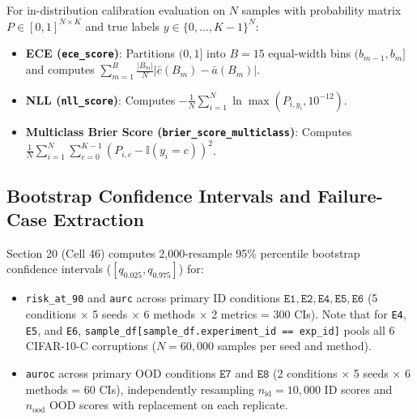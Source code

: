 \documentclass[11pt,a4paper]{article}
\begin{document}
For in-distribution calibration evaluation on $N$ samples with probability matrix $P \in [0, 1]^{N \times K}$ and true labels $y \in \{0, \dots, K-1\}^N$:
\begin{itemize}
  \item \textbf{ECE (\texttt{ece\_\allowbreak{}score})}: Partitions $(0, 1]$ into $B = 15$ equal-width bins $(b_{m-1}, b_m]$ and computes $\sum_{m=1}^B \frac{|B_m|}{N} \left|\bar{c}(B_m) - \bar{a}(B_m)\right|$.
  \item \textbf{NLL (\texttt{nll\_\allowbreak{}score})}: Computes $-\frac{1}{N} \sum_{i=1}^N \ln \max(P_{i, y_i}, 10^{-12})$.
  \item \textbf{Multiclass Brier Score (\texttt{brier\_\allowbreak{}score\_\allowbreak{}multiclass})}: Computes $\frac{1}{N} \sum_{i=1}^N \sum_{c=0}^{K-1} (P_{i,c} - \mathbb{I}(y_i = c))^2$.
\end{itemize}

\subsection{Bootstrap Confidence Intervals and Failure-Case Extraction}

Section 20 (Cell 46) computes 2,000-resample 95\% percentile bootstrap confidence intervals ($[q_{0.025}, q_{0.975}]$) for:
\begin{itemize}
  \item \texttt{risk\_\allowbreak{}at\_\allowbreak{}90} and \texttt{aurc} across primary ID conditions $\texttt{E1}, \texttt{E2}, \texttt{E4}, \texttt{E5}, \texttt{E6}$ (5 conditions $\times$ 5 seeds $\times$ 6 methods $\times$ 2 metrics = 300 CIs). Note that for \texttt{E4}, \texttt{E5}, and \texttt{E6}, \texttt{sample\_\allowbreak{}df[sample\_\allowbreak{}df.\allowbreak{}experiment\_\allowbreak{}id == exp\_\allowbreak{}id]} pools all 6 CIFAR-10-C corruptions ($N = 60,000$ samples per seed and method).
  \item \texttt{auroc} across primary OOD conditions $\texttt{E7}$ and $\texttt{E8}$ (2 conditions $\times$ 5 seeds $\times$ 6 methods = 60 CIs), independently resampling $n_{\text{id}} = 10,000$ ID scores and $n_{\text{ood}}$ OOD scores with replacement on each replicate.
\end{itemize}
\end{document}
